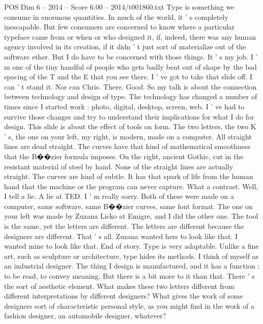 \begin{textsample}{POS Dim 6 – 2014 – Score 6.00 – 2014/t001860.txt}  \label{ex:f6_pos_048}
Type is something we consume in enormous quantities.
In much of the world, it ' s completely inescapable.
But few consumers are concerned to know where a particular typeface came from or when or who designed it, if, indeed, there was any human agency involved in its creation, if it didn ' t just sort of materialize out of the software ether.
But I do have to be concerned with those things.
It ' s my job.
I ' m one of the tiny handful of people who gets badly bent out of shape by the bad spacing of the T and the E that you see there.
I ' ve got to take that slide off.
I can ' t stand it.
Nor can Chris.
There.
Good.
So my talk is about the connection between technology and design of type.
The technology has changed a number of times since I started work : photo, digital, desktop, screen, web.
I ' ve had to survive those changes and try to understand their implications for what I do for design.
This slide is about the effect of tools on form.
The two letters, the two K ' s, the one on your left, my right, is modern, made on a computer.
All straight lines are dead straight.
The curves have that kind of mathematical smoothness that the B{\EmojiFont �}{\EmojiFont �}zier formula imposes.
On the right, ancient Gothic, cut in the resistant material of steel by hand.
None of the straight lines are actually straight.
The curves are kind of subtle.
It has that spark of life from the human hand that the machine or the program can never capture.
What a contrast.
Well, I tell a lie.
A lie at TED.
I ' m really sorry.
Both of these were made on a computer, same software, same B{\EmojiFont �}{\EmojiFont �}zier curves, same font format.
The one on your left was made by Zuzana Licko at Emigre, and I did the other one.
The tool is the same, yet the letters are different.
The letters are different because the designers are different.
That ' s all.
Zuzana wanted hers to look like that.
I wanted mine to look like that.
End of story.
Type is very adaptable.
Unlike a fine art, such as sculpture or architecture, type hides its methods.
I think of myself as an industrial designer.
The thing I design is manufactured, and it has a function : to be read, to convey meaning.
But there is a bit more to it than that.
There ' s the sort of aesthetic element.
What makes these two letters different from different interpretations by different designers?
What gives the work of some designers sort of characteristic personal style, as you might find in the work of a fashion designer, an automobile designer, whatever?

\end{textsample}
